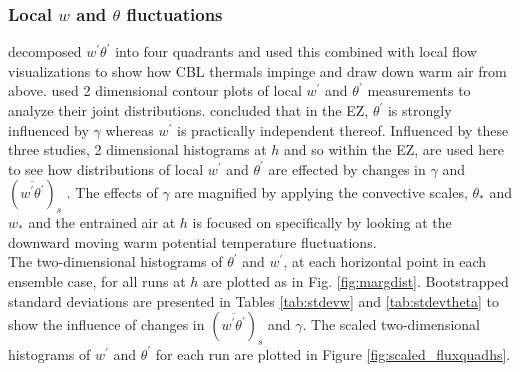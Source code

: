 \subsubsection{Local $w$ and $\theta$ fluctuations}
\label{subsubsec:locfluc}

\cite{SullMoengStev} decomposed $w^{'}\theta^{'}$ into four quadrants and used this combined with local flow visualizations to show how CBL thermals impinge and draw down warm air from above. \cite{MahrtPaum} used 2 dimensional contour plots of local $w^{'}$ and $\theta^{'}$ measurements to analyze their joint distributions.  \cite{Sorbjan1} concluded that in the EZ, $\theta^{'}$ is strongly influenced by $\gamma$  whereas $w^{'}$ is practically independent thereof.  Influenced by these three studies, 2 dimensional histograms at $h$ and so within the EZ, are used here to see how distributions of local $w^{'}$ and $\theta^{'}$ are effected by changes in $\gamma$ and $(\overline{w^{'}\theta^{'}})_{s}$ .  The effects of $\gamma$ are magnified by applying the convective scales, $\theta_{*}$ and $w_{*}$ and the entrained air at $h$ is focused on specifically by looking at the downward moving warm potential temperature fluctuations.\\    

The two-dimensional histograms of $\theta^{'}$ and $w^{'}$, at each horizontal point in each ensemble case, for all runs at $h$ are plotted as in Fig. \ref{fig:margdist}.  Bootstrapped standard deviations are presented in Tables \ref{tab:stdevw} and \ref{tab:stdevtheta} to show the influence of changes in $(\overline{w^{'} \theta^{'}})_{s}$ and $\gamma$.  The scaled two-dimensional histograms of $w^{'}$ and $\theta^{'}$ for each run are plotted in Figure \ref{fig:scaled_fluxquadhs}.\\

